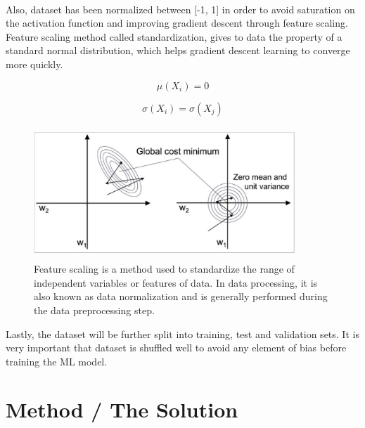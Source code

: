 \documentclass{llncs}       %
\begin{document}
\paragraph{}
Also, dataset has been normalized between [-1, 1] in order to avoid saturation on the activation function and  improving gradient descent through feature scaling.  Feature scaling method called standardization, gives to data the property of a standard normal distribution, which helps gradient descent learning to converge more quickly.


\begin{equation}
\mu (X_{i})= 0   
\end{equation}

\begin{equation} 
\sigma (X_{i}) = \sigma(X_{j})
\end{equation}

\begin{figure}[h]
\centering
\includegraphics[width=9.81cm,height=5.00cm]{media/image7.eps}
\caption{Feature scaling is a method used to standardize the 
range of independent variables or features of data. In data processing, 
it is also known as data normalization and is generally performed during 
the data preprocessing step.}
\end{figure}



Lastly, the dataset will be further split into training, test and validation sets. It is very important that dataset is shuffled well to avoid any element of bias before training the ML model. 

\paragraph{}

\section{Method / The Solution}
\label{sec:3}
\end{document}
